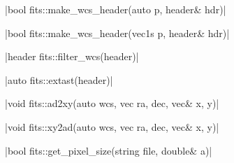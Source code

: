 \funcitem \cppinline|bool fits::make_wcs_header(auto p, header& hdr)| 

\cppinline|bool fits::make_wcs_header(vec1s p, header& hdr)|

\funcitem \cppinline|header fits::filter_wcs(header)| 

\funcitem \cppinline|auto fits::extast(header)| 

\funcitem \cppinline|void fits::ad2xy(auto wcs, vec ra, dec, vec& x, y)| 

\cppinline|void fits::xy2ad(auto wcs, vec ra, dec, vec& x, y)| 

\funcitem \cppinline|bool fits::get_pixel_size(string file, double& a)| 
